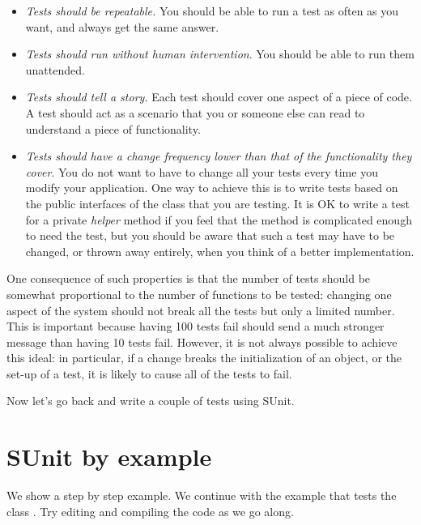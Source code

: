 \documentclass[10pt,twoside,english]{_support/latex/sbabook/sbabook}
\begin{document}
\begin{itemize}
\item \textit{Tests should be repeatable.} You should be able to run a test as often as you want, and always get the same answer.
\end{itemize}

\begin{itemize}
\item \textit{Tests should run without human intervention}. You should be able to run them unattended.
\end{itemize}

\begin{itemize}
\item \textit{Tests should tell a story.} Each test should cover one aspect of a piece of code. A test should act as a scenario that you or someone else can read to understand a piece of functionality.
\end{itemize}

\begin{itemize}
\item \textit{Tests should have a change frequency lower than that of the functionality they cover}. You do not want to have to change all your tests every time you modify your application. One way to achieve this is to write tests based on the public interfaces of the class that you are testing. It is OK to write a test for a private \textit{helper} method if you feel that the method is complicated enough to need the test, but you should be aware that such a test may have to be changed, or thrown away entirely, when you think of a better implementation.
\end{itemize}

One consequence of such properties is that the number of tests should be
somewhat proportional to the number of functions to be tested: changing one
aspect of the system should not break all the tests but only a limited number.
This is important because having 100 tests fail should send a much stronger
message than having 10 tests fail. However, it is not always possible to achieve
this ideal: in particular, if a change breaks the initialization of an object,
or the set-up of a test, it is likely to cause all of the tests to fail.

Now let's go back and write a couple of tests using SUnit.
\section{SUnit by example}
We show a step by step example. We continue with the example that tests the class . Try editing and compiling the code as we go along. 
\end{document}
